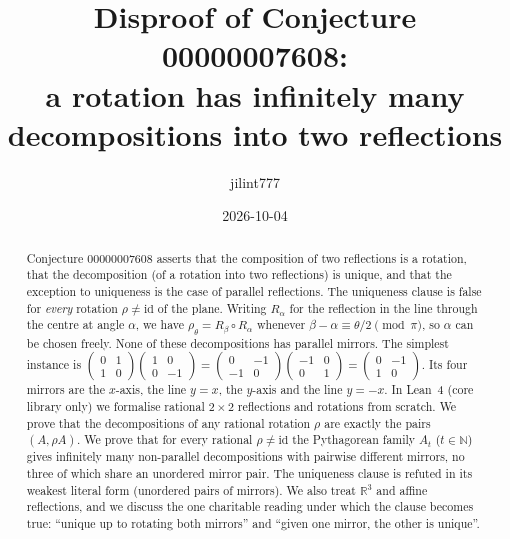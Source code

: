 \documentclass[11pt]{article}
\title{Disproof of Conjecture 00000007608:\\
a rotation has infinitely many decompositions into two reflections}
\author{jilint777}
\date{2026-10-04}
\theoremstyle{definition}
\theoremstyle{remark}
\newcommand{\R}{\mathbb R}
\newcommand{\N}{\mathbb N}
\newcommand{\id}{\mathrm{id}}
\begin{document}
\sloppy
\maketitle

\begin{abstract}
Conjecture 00000007608 asserts that the composition of two reflections is a rotation, that the
decomposition (of a rotation into two reflections) is unique, and that the exception to
uniqueness is the case of parallel reflections. The uniqueness clause is false for
\emph{every} rotation $\rho\neq\id$ of the plane. Writing $R_\alpha$ for the reflection in the
line through the centre at angle $\alpha$, we have $\rho_\theta=R_\beta\circ R_\alpha$ whenever
$\beta-\alpha\equiv\theta/2\pmod\pi$, so $\alpha$ can be chosen freely. None of these
decompositions has parallel mirrors. The simplest instance is
$\left(\begin{smallmatrix}0&1\\1&0\end{smallmatrix}\right)
\left(\begin{smallmatrix}1&0\\0&-1\end{smallmatrix}\right)=
\left(\begin{smallmatrix}0&-1\\-1&0\end{smallmatrix}\right)
\left(\begin{smallmatrix}-1&0\\0&1\end{smallmatrix}\right)=
\left(\begin{smallmatrix}0&-1\\1&0\end{smallmatrix}\right)$. Its four mirrors are the $x$-axis,
the line $y=x$, the $y$-axis and the line $y=-x$. In Lean~4 (core library only) we formalise
rational $2\times2$ reflections and rotations from scratch. We prove that the decompositions of
any rational rotation $\rho$ are exactly the pairs $(A,\rho A)$. We prove that for every rational
$\rho\neq\id$ the Pythagorean family $A_t$ ($t\in\N$) gives infinitely many non-parallel
decompositions with pairwise different mirrors, no three of which share an unordered mirror
pair. The uniqueness clause is refuted in its weakest literal form (unordered pairs of mirrors).
We also treat $\R^3$ and affine reflections, and we discuss the one charitable reading under
which the clause becomes true: ``unique up to rotating both mirrors'' and ``given one mirror,
the other is unique''.
\end{abstract}
\end{document}
